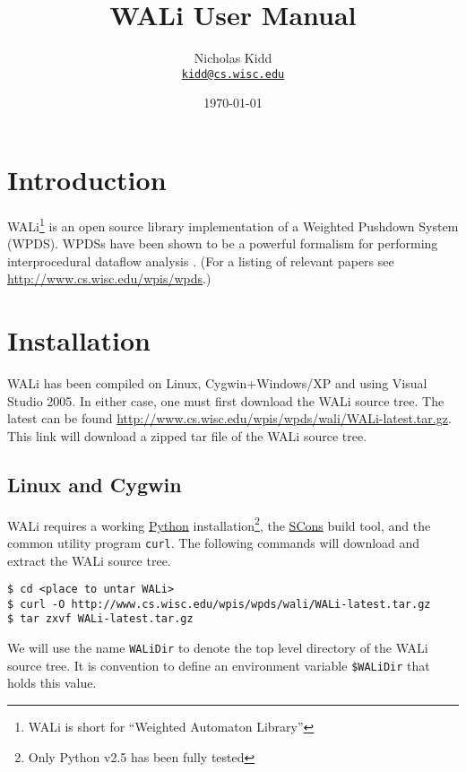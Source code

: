 \documentclass[english,a4paper,11pt]{article}
\title{WALi User Manual}
\date{\today}
\author{ Nicholas Kidd \\ { \href{mailto:kidd@cs.wisc.edu}{\nolinkurl{kidd@cs.wisc.edu}}} }
\theoremstyle{definition}
\begin{document}
\maketitle

\section{Introduction}
\label{Se:Introduction}
WALi\footnote{WALi is short for ``Weighted Automaton Library''} is an open
source library implementation of a Weighted Pushdown System (WPDS). WPDSs have
been shown to be a powerful formalism for performing interprocedural dataflow
analysis \cite{SAS:RSJ:2003,SCP:RSJM:2005,FSTTCS:RLK:2007}. (For a listing of
relevant papers see \url{http://www.cs.wisc.edu/wpis/wpds}.)

\section{Installation}
\label{Se:Installation}
WALi has been compiled on Linux, Cygwin+Windows/XP and using
Visual Studio 2005. In either case, one must first download the WALi source
tree. The latest can be found
\href{http://www.cs.wisc.edu/wpis/wpds/wali/WALi-latest.tar.gz}{http://www.cs.wisc.edu/wpis/wpds/wali/WALi-latest.tar.gz}.
This link will download a zipped tar file of the WALi source tree.

\subsection{Linux and Cygwin}
\label{Se:Linux}
WALi requires a working \href{http://www.python.org}{Python}
installation\footnote{Only Python v2.5 has been fully tested},
the \href{http://www.scons.org}{SCons} build tool, and the common utility
program \verb!curl!. The following commands will download and extract the WALi
source tree.

\vspace{1em}
\noindent
\begin{cmdbox}
\begin{verbatim}
$ cd <place to untar WALi>
$ curl -O http://www.cs.wisc.edu/wpis/wpds/wali/WALi-latest.tar.gz 
$ tar zxvf WALi-latest.tar.gz
\end{verbatim}
\end{cmdbox}
\vspace{1em}

\noindent  We will use the name \verb!WALiDir! to denote the top level directory of the
WALi source tree. It is convention to define an environment variable
\verb!$WALiDir! that holds this value.
\end{document}
